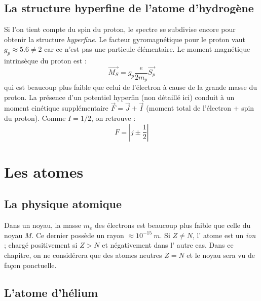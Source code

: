 \documentclass	[11pt, a4paper, openany]{book}
\begin{document}
	\section{La structure hyperfine de l'atome d'hydrogène}
	Si l'on tient compte du spin du proton, le spectre se subdivise encore pour obtenir
	la structure \textit{hyperfine}. Le facteur gyromagnétique pour le proton vaut $
	g_p \approx 5.6 \neq 2$ car ce n'est pas une particule élémentaire. Le moment 
	magnétique intrinsèque du proton est :
	\begin{equation}
		\vec{M_S} = g_p \frac{e}{2m_p}\vec{S_p}
	\end{equation}
	qui est beaucoup plus faible que celui de l'électron à cause de la grande masse du
	proton. La présence d'un potentiel hyperfin (non détaillé ici) conduit à un moment
	cinétique supplémentaire $\vec{F}=\vec{J}+\vec{I}$ (moment total de l'électron +
	spin du proton). Comme $I = 1/2$, on retrouve :
	\begin{equation}
		F = \left|j\pm\frac{1}{2}\right|
	\end{equation}
		
		
		
		
		
		
	
	
	\chapter{Les atomes}
	\section{La physique atomique}
	Dans un noyau, la masse $m_e$ des électrons est beaucoup plus faible que celle du
	noyau $M$. Ce dernier possède un rayon $\approx 10^{-15}\ m$. Si $Z \neq N$, l'
	atome est un \textit{ion} ; chargé positivement si $Z>N$ et négativement dans l'
	autre cas. Dans ce chapitre, on ne considérera que des atomes neutres $Z=N$ et le
	noyau sera vu de façon ponctuelle.
	    
	\section{L'atome d'hélium}
\end{document}
